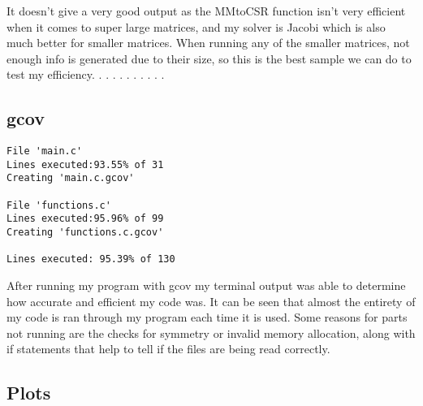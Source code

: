 \documentclass[12pt]{article}
\begin{document}
It doesn't give a very good output as the MMtoCSR function isn't very efficient when it comes to super large matrices, and my solver is Jacobi which is also much better for smaller matrices. When running any of the smaller matrices, not enough info is generated due to their size, so this is the best sample we can do to test my efficiency. \newline
. \newline
. \newline
. \newline
. \newline
. \newline
. \newline
. \newline
. \newline
. \newline
. \newline


\subsection{gcov}

\begin{lstlisting}
File 'main.c'
Lines executed:93.55% of 31
Creating 'main.c.gcov'

File 'functions.c'
Lines executed:95.96% of 99
Creating 'functions.c.gcov'

Lines executed: 95.39% of 130
\end{lstlisting}

After running my program with gcov my terminal output was able to determine how accurate and efficient my code was. It can be seen that almost the entirety of my code is ran through my program each time it is used. Some reasons for parts not running are the checks for symmetry or invalid memory allocation, along with if statements that help to tell if the files are being read correctly. 


\subsection{Plots}
\end{document}
